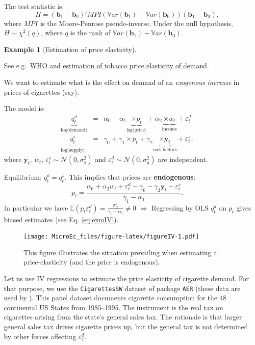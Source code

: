 \documentclass[
  12pt,
]{book}
\theoremstyle{definition}
\theoremstyle{definition}
\newtheorem{example}{Example}[chapter]
\theoremstyle{definition}
\theoremstyle{definition}
\theoremstyle{remark}
\begin{document}
The test statistic is:
\[
H = (\mathbf{b}_1 - \mathbf{b}_0)' MPI(\mathbb{V}ar(\mathbf{b}_1) - \mathbb{V}ar(\mathbf{b}_0))(\mathbf{b}_1 - \mathbf{b}_0),
\]
where \(MPI\) is the Moore-Penrose pseudo-inverse. Under the null hypothesis, \(H \sim \chi^2(q)\), where \(q\) is the rank of \(\mathbb{V}ar(\mathbf{b}_1) - \mathbb{V}ar(\mathbf{b}_0)\).

\begin{example}[Estimation of price elasticity]
\protect\hypertarget{exm:priceElasticity}{}\label{exm:priceElasticity}

See e.g.~\href{http://www.who.int/tobacco/economics/2_2estimatingpriceincomeelasticities.pdf?ua=1}{WHO and estimation of tobacco price elasticity of demand}.

We want to estimate what is the effect on demand of an \emph{exogenous increase} in prices of cigarettes (say).

The model is:
\begin{eqnarray*}
\underbrace{q^d_t}_{\mbox{log(demand)}} &=& \alpha_0 + \alpha_1 \underbrace{\times p_t}_{\mbox{log(price)}} + \alpha_2 \underbrace{\times w_t}_{\mbox{income}} + \varepsilon_t^d\\
\underbrace{q^s_t}_{\mbox{log(supply)}} &=& \gamma_0 + \gamma_1 \times p_t + \gamma_2 \underbrace{\times \mathbf{y}_t}_{\mbox{cost factors}} + \varepsilon_t^s,
\end{eqnarray*}
where \(\mathbf{y}_t\), \(w_t\), \(\varepsilon_t^s \sim \mathcal{N}(0,\sigma^2_s)\) and \(\varepsilon_t^d \sim \mathcal{N}(0,\sigma^2_d)\) are independent.

Equilibrium: \(q^d_t = q^s_t\). This implies that prices are \textbf{endogenous}:
\[
p_t = \frac{\alpha_0 + \alpha_2 w_t + \varepsilon_t^d - \gamma_0 - \gamma_2 \mathbf{y}_t - \varepsilon_t^s}{\gamma_1 - \alpha_1}.
\]
In particular we have \(\mathbb{E}(p_t \varepsilon_t^d) = \frac{\sigma^2_d}{\gamma_1 - \alpha_1} \ne 0\) \(\Rightarrow\) Regressing by OLS \(q_t^d\) on \(p_t\) gives biased estimates (see Eq. \eqref{eq:exmIV}).

\begin{figure}
\centering
\texttt{[image: MicroEc\_files/figure-latex/figureIV-1.pdf]}
\caption{\label{fig:figureIV}This figure illustrates the situation prevailing when estimating a price-elasticity (and the price is endogenous).}
\end{figure}

Let us use IV regressions to estimate the price elasticity of cigarette demand. For that purpose, we use the \texttt{CigarettesSW} dataset of package \texttt{AER} (these data are used by \citet{Stock_Watson_2003}). This panel dataset documents cigarette consumption for the 48 continental US States from 1985--1995. The instrument is the real tax on cigarettes arising from the state's general sales tax. The rationale is that larger general sales tax drives cigarette prices up, but the general tax is not determined by other forces affecting \(\varepsilon_t^d\).


\end{example}
\end{document}
